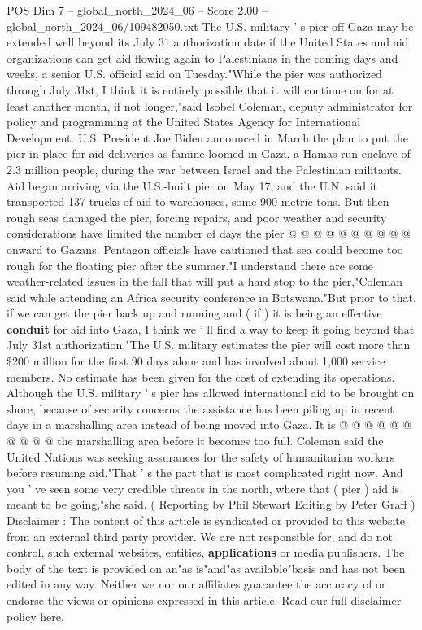 \begin{textsample}{POS Dim 7 – global\_north\_2024\_06 – Score 2.00 – global\_north\_2024\_06/109482050.txt}  \label{ex:f7_pos_314}
The U.S. military ' s pier off Gaza may be extended well beyond its July 31 authorization date if the United States and aid organizations can get aid flowing again to Palestinians in the coming days and weeks, a senior U.S. official said on Tuesday."While the pier was authorized through July 31st, I think it is entirely possible that it will continue on for at least another month, if not longer,"said Isobel Coleman, deputy administrator for policy and programming at the United States Agency for International Development.
U.S.
President Joe Biden announced in March the plan to put the pier in place for aid deliveries as famine loomed in Gaza, a Hamas-run enclave of 2.3 million people, during the war between Israel and the Palestinian militants.
Aid began arriving via the U.S.-built pier on May 17, and the U.N. said it transported 137 trucks of aid to warehouses, some 900 metric tons.
But then rough seas damaged the pier, forcing repairs, and poor weather and security considerations have limited the number of days the pier @ @ @ @ @ @ @ @ @ @ onward to Gazans.
Pentagon officials have cautioned that sea could become too rough for the floating pier after the summer."I understand there are some weather-related issues in the fall that will put a hard stop to the pier,"Coleman said while attending an Africa security conference in Botswana."But prior to that, if we can get the pier back up and running and ( if ) it is being an effective \textbf{conduit} for aid into Gaza, I think we ' ll find a way to keep it going beyond that July 31st authorization."The U.S. military estimates the pier will cost more than \$200 million for the first 90 days alone and has involved about 1,000 service members.
No estimate has been given for the cost of extending its operations.
Although the U.S. military ' s pier has allowed international aid to be brought on shore, because of security concerns the assistance has been piling up in recent days in a marshalling area instead of being moved into Gaza.
It is @ @ @ @ @ @ @ @ @ @ the marshalling area before it becomes too full.
Coleman said the United Nations was seeking assurances for the safety of humanitarian workers before resuming aid."That ' s the part that is most complicated right now.
And you ' ve seen some very credible threats in the north, where that ( pier ) aid is meant to be going,"she said. ( Reporting by Phil Stewart Editing by Peter Graff ) Disclaimer : The content of this article is syndicated or provided to this website from an external third party provider.
We are not responsible for, and do not control, such external websites, entities, \textbf{applications} or media publishers.
The body of the text is provided on an"as is"and"as available"basis and has not been edited in any way.
Neither we nor our affiliates guarantee the accuracy of or endorse the views or opinions expressed in this article.
Read our full disclaimer policy here.

\end{textsample}
